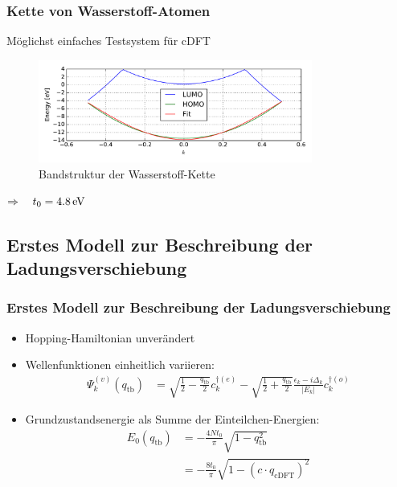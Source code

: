 \begin{frame}
\frametitle{Kette von Wasserstoff-Atomen}
\begin{minipage}{0.6\textwidth}
Möglichst einfaches Testsystem für cDFT
\end{minipage}
\begin{minipage}{0.39\textwidth}
\centering
{}
\end{minipage}
\begin{figure}[]
	\centering
	\includegraphics[width = 9cm]{Images/Hydrogen/bands/hydrogen_band_structure}
	\caption{Bandstruktur der Wasserstoff-Kette}
	\label{image_hydrogen_band_structure}
\end{figure}
\centering
$\Rightarrow\quad t_0 = \unit[4.8]{eV}$ 
\end{frame}

\subsection{Erstes Modell zur Beschreibung der Ladungsverschiebung}
\begin{frame}
\frametitle{Erstes Modell zur Beschreibung der Ladungsverschiebung}
\begin{itemize}
\item Hopping-Hamiltonian unverändert
\item Wellenfunktionen einheitlich variieren:
\begin{align*}
\Psi_k^{(v)}(q_\text{tb}) &= \sqrt{\frac{1}{2}-\frac{q_\text{tb}}{2}}c_k^{\dagger(e)}- \sqrt{\frac{1}{2}+\frac{q_\text{tb}}{2}}\frac{\epsilon_k - i \Delta_k}{|E_k|}c_{k}^{\dagger(o)}
\end{align*}
\item Grundzustandsenergie als Summe der Einteilchen-Energien:
\begin{align*}
E_0(q_\text{tb}) &= -\frac{4Nt_0}{\pi} \sqrt{1-q^2_\text{tb}}\\
&= -\frac{8t_0}{\pi} \sqrt{1 - \left(c\cdot q_\text{cDFT}\right)^2}
\end{align*}
\end{itemize}
\end{frame}

